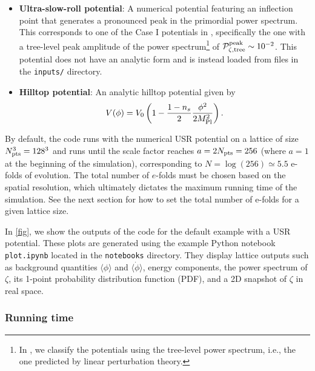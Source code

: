 \documentclass[aps, nofootinbib,superscriptaddress, preprintnumbers, longbibliography]{article}
\begin{document}
\begin{itemize}
    \item \textbf{Ultra-slow-roll potential}: A numerical potential featuring an inflection point that generates a pronounced peak in the primordial power spectrum. This corresponds to one of the Case I potentials in \cite{Caravano:2024moy, Caravano:2025diq}, specifically the one with a tree-level peak amplitude of the power spectrum\footnote{In \cite{Caravano:2024moy,Caravano:2025diq}, we classify the potentials using the tree-level power spectrum, i.e., the one predicted by linear perturbation theory.} of $\mathcal{P}_{\zeta,\rm tree}^{\rm peak} \sim 10^{-2}$. This potential does not have an analytic form and is instead loaded from files in the \texttt{inputs/} directory.

    \item \textbf{Hilltop potential}: An analytic hilltop potential \cite{Boubekeur:2005zm} given by \begin{equation}
    V(\phi) = V_0 \left(1 - \frac{1-n_s}{2}\frac{\phi^2}{2 M_{\rm Pl}^2}\right).
    \end{equation}
\end{itemize}
By default, the code runs with the numerical USR potential on a lattice of size $N_{\rm pts}^3 = 128^3$ and runs until the scale factor reaches $a=2N_{\rm pts}=256$ (where $a=1$ at the beginning of the simulation), corresponding to $N = \log(256) \simeq 5.5$ e-folds of evolution. The total number of $e$-folds must be chosen based on the spatial resolution, which ultimately dictates the maximum running time of the simulation. See the next section for how to set the total number of e-folds for a given lattice size.

In \cref{fig}, we show the outputs of the code for the default example with a USR potential. These plots are generated using the example Python notebook \texttt{{plot.ipynb}} located in the \texttt{{notebooks}} directory. They display lattice outputs such as background quantities $\langle \phi \rangle$ and $\langle \dot{\phi} \rangle$, energy components, the power spectrum of $\zeta$, its 1-point probability distribution function (PDF), and a 2D snapshot of $\zeta$ in real space.

\subsubsection*{Running time}
\end{document}
